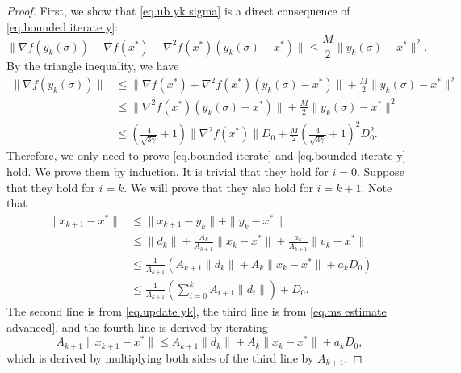 \documentclass{article}
\begin{document}
\begin{proof}
    First, we show that \eqref{eq.ub yk sigma} is a direct consequence of \eqref{eq.bounded iterate y}:
    \begin{equation*}
            \|\nabla f(y_k(\sigma)) - \nabla f(x^*) -\nabla^2 f(x^*)(y_k(\sigma)-x^*)\| \leq \frac{M}{2}\|y_k(\sigma)-x^*\|^2.
    \end{equation*}
    By the triangle inequality, we have
    \begin{equation*}
        \begin{aligned}
            \|\nabla f(y_k(\sigma)) \| &\leq \|\nabla f(x^*)+\nabla^2 f(x^*)(y_k(\sigma)-x^*)\| +\frac{M}{2}\|y_k(\sigma)-x^*\|^2\\
            &\leq \|\nabla^2 f(x^*)(y_k(\sigma)-x^*)\|+\frac{M}{2}\|y_k(\sigma)-x^*\|^2\\
            &\leq \left(\frac{4}{\sqrt{3\gamma}}+1\right)\|\nabla ^2 f(x^*)\|D_0+\frac{M}{2}\left(\frac{4}{\sqrt{3\gamma}}+1\right)^2 D_0^2.
        \end{aligned}
    \end{equation*}
    Therefore, we only need to prove \eqref{eq.bounded iterate} and \eqref{eq.bounded iterate y} hold. We prove them by induction. It is trivial that they hold for $i=0$. Suppose that they hold for $i=k$. We will prove that they also hold for $i=k+1$. Note that
    \begin{equation*}
    \begin{aligned}
        \|x_{k+1}-x^*\| &\leq \|x_{k+1}-y_k\| + \|y_k-x^*\|\\
        & \leq \|d_k\|+ \frac{A_k}{A_{k+1}} \|x_k-x^*\| +\frac{a_k}{A_{k+1}}\|v_k-x^*\| \\
        &\leq \frac{1}{A_{k+1}}\left(A_{k+1}\|d_k\| +A_k\|x_k-x^*\| +  a_k D_0\right)\\
        &\leq \frac{1}{A_{k+1}}\left (\sum_{i=0}^k A_{i+1}\|d_i\|\right)+D_0.
        \end{aligned}
    \end{equation*}
    The second line is from \eqref{eq.update yk}, the third line is from \eqref{eq.ms estimate advanced}, and the fourth line is derived by iterating 
    \begin{equation*}
        A_{k+1} \|x_{k+1}-x^*\|\leq A_{k+1}\|d_k\|+A_k\|x_k-x^*\|+a_k D_0,
    \end{equation*}
    which is derived by multiplying both sides of the third line by $A_{k+1}$.


\end{proof}
\end{document}
